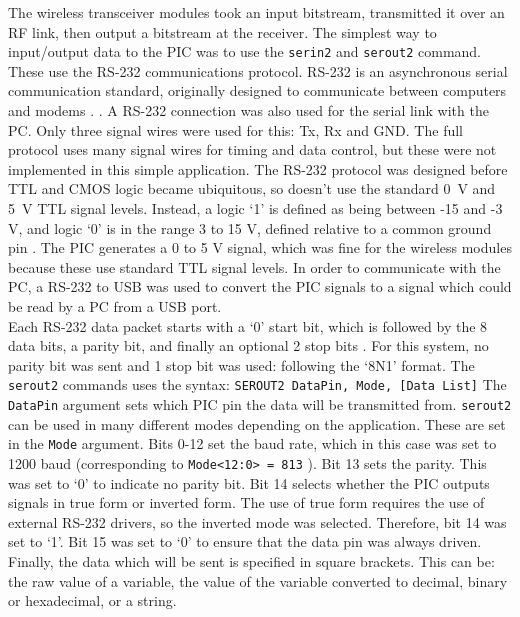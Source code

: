 The wireless transceiver modules took an input bitstream, transmitted it over an RF link, then output a bitstream at the receiver. The simplest way to input/output data to the PIC was to use the \verb|serin2| and \verb|serout2| command. These use the RS-232 communications protocol. RS-232 is an asynchronous serial communication standard, originally designed to communicate between computers and modems \cite{rs232}. . A RS-232 connection was also used for the serial link with the PC. Only three signal wires were used for this: Tx, Rx and GND. The full protocol uses many signal wires for timing and data control, but these were not implemented in this simple application. The RS-232 protocol was designed before TTL and CMOS logic became ubiquitous, so doesn't use the standard \SI{0}{\volt} and \SI{5}{\volt} TTL signal levels. Instead, a logic `1' is defined as being between -15 and -3 V, and logic `0' is in the range 3 to 15 V, defined relative to a common ground pin \cite{rs232}. The PIC generates a 0 to 5 V signal, which was fine for the wireless modules because these use standard TTL signal levels. In order to communicate with the PC, a RS-232 to USB was used to convert the PIC signals to a signal which could be read by a PC from a USB port.\\

Each RS-232 data packet starts with a `0' start bit, which is followed by the 8 data bits, a parity bit, and finally an optional 2 stop bits \cite{rs232}. For this system, no parity bit was sent and 1 stop bit was used: following the `8N1' format. The \verb|serout2| commands uses the syntax:
\verb|SEROUT2 DataPin, Mode, [Data List]|
The \verb|DataPin| argument sets which PIC pin the data will be transmitted from. \verb|serout2| can be used in many different modes depending on the application. These are set in the \verb|Mode| argument. Bits 0-12 set the baud rate, which in this case was set to 1200 baud (corresponding to \verb|Mode<12:0> = 813| \cite{picbasic_pro}). Bit 13 sets the parity. This was set to `0' to indicate no parity bit. Bit 14 selects whether the PIC outputs signals in true form or inverted form. The use of true form requires the use of external RS-232 drivers, so the inverted mode was selected. Therefore, bit 14 was set to `1'. Bit 15 was set to `0' to ensure that the data pin was always driven. Finally, the data which will be sent is specified in square brackets. This can be: the raw value of a variable, the value of the variable converted to decimal, binary or hexadecimal, or a string.\\

